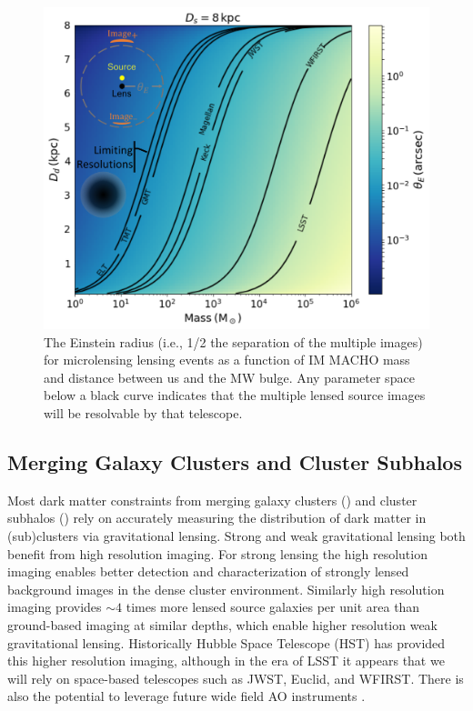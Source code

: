 \begin{figure}
\label{fig:strong_microlensing}
\centering
\includegraphics[width=0.6\columnwidth]{figures/StrongMicrolensing.png}
\caption{The Einstein radius (i.e., 1/2 the separation of the multiple images) for microlensing lensing events as a function of IM MACHO mass and distance between us and the MW bulge. Any parameter space below a black curve indicates that the multiple lensed source images will be resolvable by that telescope. }
\end{figure}

\subsection{Merging Galaxy Clusters and Cluster Subhalos}

Most dark matter constraints from merging galaxy clusters () and cluster subhalos () rely on accurately measuring the distribution of dark matter in (sub)clusters via gravitational lensing.
Strong and weak gravitational lensing both benefit from high resolution imaging.
For strong lensing the high resolution imaging enables better detection and characterization of strongly lensed background images in the dense cluster environment.
Similarly high resolution imaging provides $\sim4$ times more lensed source galaxies per unit area than ground-based imaging at similar depths, which enable higher resolution weak gravitational lensing.
Historically Hubble Space Telescope (HST) has provided this higher resolution imaging, although in the era of LSST it appears that we will rely on space-based telescopes such as JWST, Euclid, and WFIRST.
There is also the potential to leverage future wide field AO instruments .

